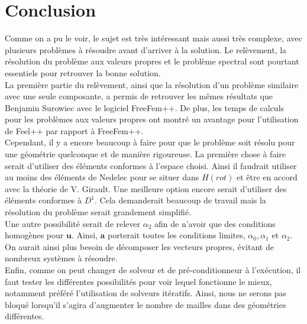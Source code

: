 \chapter*{Conclusion}
Comme on a pu le voir, le sujet est très intéressant mais aussi très complexe, avec plusieurs problèmes à résoudre avant d'arriver à la solution. Le relèvement, la résolution du problème aux valeurs propres et le problème spectral sont pourtant essentiels pour retrouver la bonne solution.\\

La première partie du relèvement, ainsi que la résolution d'un problème similaire avec une seule composante, a permis de retrouver les mêmes résultats que Benjamin Surowiec avec le logiciel FreeFem++. De plus, les temps de calculs pour les problèmes aux valeurs propres ont montré un avantage pour l'utilisation de Feel++ par rapport à FreeFem++.\\

Cependant, il y a encore beaucoup à faire pour que le problème soit résolu pour une géométrie quelconque et de manière rigoureuse. La première chose à faire serait d'utiliser des éléments conformes à l'espace choisi. Ainsi il faudrait utiliser au moins des éléments de Nedelec pour se situer dans $H(rot)$ et être en accord avec la théorie de V. Girault. Une meilleure option encore serait d'utiliser des éléments conformes à $D^1$. Cela demanderait beaucoup de travail mais la résolution du problème serait grandement simplifié.\\

Une autre possibilité serait de relever $\alpha_2$ afin de n'avoir que des conditions homogènes pour $\bm{u}$. Ainsi, $\bm{a}$ porterait toutes les conditions limites, $\alpha_0,\alpha_1$ et $\alpha_2$. On aurait ainsi plus besoin de décomposer les vecteurs propres, évitant de nombreux systèmes à résoudre.\\

Enfin, comme on peut changer de solveur et de pré-conditionneur à l'exécution, il faut tester les différentes possibilités pour voir lequel fonctionne le mieux, notamment préféré l'utilisation de solveurs itératifs. Ainsi, nous ne serons pas bloqué lorsqu'il s'agira d'augmenter le nombre de mailles dans des géométries différentes.

